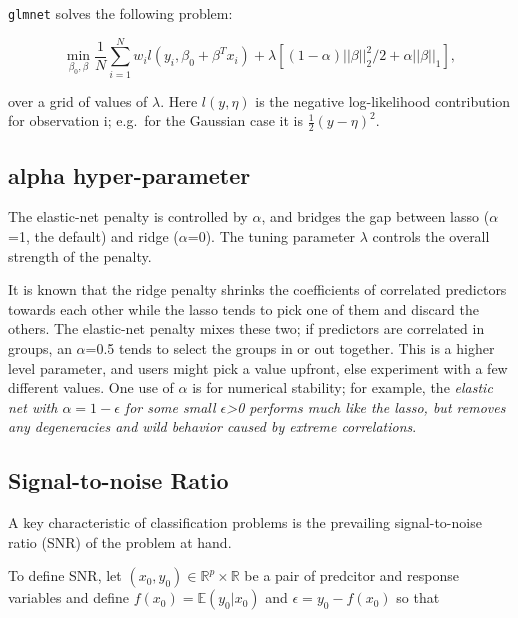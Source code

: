 \documentclass[
]{book}
\begin{document}
\texttt{glmnet} solves the following problem:

\[\min_{\beta_0,\beta} \frac{1}{N} \sum_{i=1}^{N} w_i l(y_i,\beta_0+\beta^T x_i) + \lambda\left[(1-\alpha)||\beta||_2^2/2 + \alpha ||\beta||_1\right],\]

over a grid of values of \(\lambda\).
Here \(l(y,\eta)\) is the negative log-likelihood contribution for observation i;
e.g.~for the Gaussian case it is \(\frac{1}{2}(y-\eta)^2\).

\hypertarget{alpha-hyper-parameter}{%
\subsection*{\texorpdfstring{\textbf{alpha} hyper-parameter}{alpha hyper-parameter}}\label{alpha-hyper-parameter}}

The elastic-net penalty is controlled by \(\alpha\), and bridges the gap between
lasso (\(\alpha\)=1, the default) and ridge (\(\alpha\)=0).
The tuning parameter \(\lambda\) controls the overall strength of the penalty.

It is known that the ridge penalty shrinks the coefficients of correlated predictors
towards each other while the lasso tends to pick one of them and discard the others.
The elastic-net penalty mixes these two; if predictors are correlated in groups,
an \(\alpha\)=0.5 tends to select the groups in or out together.
This is a higher level parameter, and users might pick a value upfront,
else experiment with a few different values. One use of \(\alpha\) is for numerical stability;
for example, the \emph{elastic net with \(\alpha = 1 - \epsilon\) for some small \(\epsilon\)\textgreater0
performs much like the lasso, but removes any degeneracies and wild behavior caused
by extreme correlations}.

\hypertarget{signal-to-noise-ratio}{%
\subsection*{Signal-to-noise Ratio}\label{signal-to-noise-ratio}}

A key characteristic of classification problems is the
prevailing signal-to-noise ratio (SNR) of the problem at hand.

To define SNR, let \((x_0, y_0) \in \mathbb{R}^p \times \mathbb{R}\)
be a pair of predcitor and response variables and define
\(f(x_0) = \mathbb{E}(y_0|x_0)\) and \(\epsilon = y_0 - f(x_0)\) so that
\end{document}
